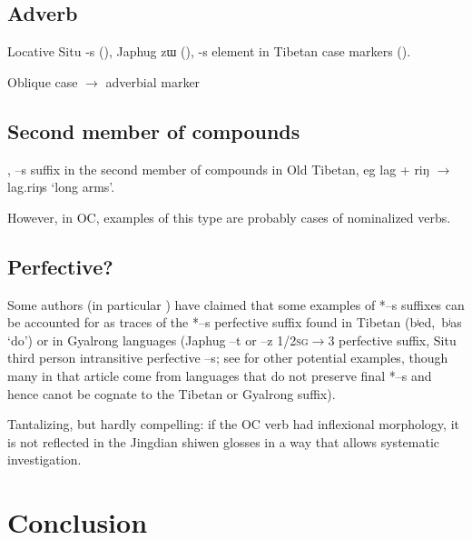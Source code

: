 \documentclass[oldfontcommands,oneside,a4paper,11pt]{article}
\newcommand{\ipa}[1]{{\phon \mbox{#1}}} %
\begin{document}
\subsection{Adverb}

 
Locative Situ \ipa{-s} (\citealt{linxr93jiarong}), Japhug \ipa{zɯ} (\citealt[167-9]{jacques08zh}), \ipa{-s} element in Tibetan case markers (\citealt{hill12bas}).

Oblique case $\rightarrow$ adverbial marker


\subsection{Second member of compounds}


\citet{uebach08rjeblas}, \ipa{--s} suffix in the second member of compounds in Old Tibetan, eg \ipa{lag} + \ipa{riŋ} $\rightarrow$ \ipa{lag.riŋs} `long arms'.

 However, in OC, examples of this type are probably cases of nominalized verbs.
 
\subsection{Perfective?}
Some authors (in particular \citealt{jinlx06}) have claimed that some examples of *\ipa{--s} suffixes can be accounted for as traces of the *\ipa{--s} perfective suffix found in Tibetan (\ipa{bʲed, bʲas} `do') or in Gyalrong languages (Japhug \ipa{--t} or \ipa{--z} \textsc{1/2sg}$\rightarrow$3 perfective suffix, Situ third person intransitive perfective \ipa{--s}; see \citealt{huangbf97s.houzhui} for other potential examples, though many in that article come from languages that do not preserve final *\ipa{--s} and hence canot be cognate to the Tibetan or Gyalrong suffix).

Tantalizing, but hardly compelling: if the OC verb had inflexional morphology, it is not reflected in the Jingdian shiwen glosses in a way that allows systematic investigation.

\section{Conclusion}



\end{document}

